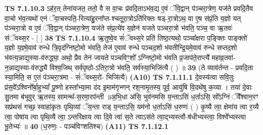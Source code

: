 \documentclass[17pt]{extarticle}
\begin{document}
                  \newline
                                \textbf{ TS 7.1.10.3} \newline
                  ऽह॑र॒त् तेना॑यजत॒ ततो॒ वै स वा॒चः प्र॑वदि॒ताऽभ॑व॒द्य ए॒वं ॅवि॒द्वान् प॑ञ्चरा॒त्रेण॒ यज॑ते प्रवदि॒तैव वा॒चो भ॑व॒त्यथो॑ एनं ॅवा॒चस्पति॒-रित्या॑हु॒रना᳚प्त-श्चतूरा॒त्रोऽति॑रिक्तः षड्-रा॒त्रोऽथ॒ वा ए॒ष स॑प्रं॒ति य॒ज्ञो यत् प॑ञ्चरा॒त्रो य ए॒वं ॅवि॒द्वान् प॑ञ्चरा॒त्रेण॒ यज॑ते संप्र॒त्ये॑व य॒ज्ञेन॑ यजते पञ्चरा॒त्रो भ॑वति॒ पञ्च॒ वा ऋ॒तवः॑ संॅवथ्स॒र - [  ] \textbf{  38} \newline
                  \newline
                                \textbf{ TS 7.1.10.4} \newline
                  ऋ॒तुष्वे॒व सं॑ॅवथ्स॒रे प्रति॑ तिष्ठ॒त्यथो॒ पञ्चा᳚क्षरा प॒ङ्क्तिः पाङ्क्तो॑ य॒ज्ञो य॒ज्ञ्मे॒वाव॑ रुन्धे त्रि॒वृद॑ग्निष्टो॒मो भ॑वति॒ तेज॑ ए॒वाव॑ रुन्धे पञ्चद॒शो भ॑वतीन्द्रि॒यमे॒वाव॑ रुन्धे सप्तद॒शो भ॑वत्य॒न्नाद्य॒स्या-व॑रुद्ध्या॒ अथो॒ प्रैव तेन॑ जायते पञ्चविꣳ॒॒शो᳚ ऽग्निष्टो॒मो भ॑वति प्र॒जाप॑ते॒राप्त्यै॑ महाव्र॒तवा॑-न॒न्नाद्य॒स्या-व॑रुद्ध्यै विश्व॒जिथ् सर्व॑पृष्ठो-ऽतिरा॒त्रो भ॑वति॒ सर्व॑स्या॒भिजि॑त्यै ( ) ॥ \textbf{  39} \newline
                  \newline
                      (ते व्याव॑र्तन्त - प्रवदि॒ता स्या॒मिति॒ स ए॒तं प॑ञ्चरा॒त्रमा - सं॑ॅवथ्स॒रो॑- भिजि॑त्यै)  \textbf{(A10)} \newline \newline
                                        \textbf{ TS 7.1.11.1} \newline
                  दे॒वस्य॑त्वा सवि॒तुः प्र॑स॒वे᳚ऽश्विनो᳚र्बा॒हुभ्यां᳚ पू॒ष्णो हस्ता᳚भ्या॒मा द॑द इ॒माम॑गृभ्णन् रश॒नामृ॒तस्य॒ पूर्व॒ आयु॑षि वि॒दथे॑षु क॒व्या । तया॑ दे॒वाः सु॒तमा ब॑भूवुर् ऋ॒तस्य॒ सामन्थ᳚-स॒रमा॒रप॑न्ती ॥अ॒भि॒धा अ॑सि॒ भुव॑नमसि य॒न्ताऽसि॑ ध॒र्ताऽसि॒ सो᳚ऽग्निं ॅवै᳚श्वान॒रꣳ सप्र॑थसं गच्छ॒ स्वाहा॑कृतः पृथि॒व्यां ॅय॒न्ता राड् य॒न्ताऽसि॒ यम॑नो ध॒र्ताऽसि॑ ध॒रुणः॑ ( ) कृ॒ष्यै त्वा॒ क्षेमा॑य त्वा र॒य्यै त्वा॒ पोषा॑य त्वा पृथि॒व्यै त्वा॒ ऽन्तरि॑क्षाय त्वा दि॒वे त्वा॑ स॒ते त्वाऽस॑ते त्वा॒द्भ्यस्त्वौ-ष॑धीभ्यस्त्वा॒ विश्वे᳚भ्यस्त्वा भू॒तेभ्यः॑ ॥ \textbf{  40 } \newline
                  \newline
                      (ध॒रुणः॒ - पञ्च॑विꣳशतिश्च)  \textbf{(A11)} \newline \newline
                                        \textbf{ TS 7.1.12.1} \newline
\end{document}
